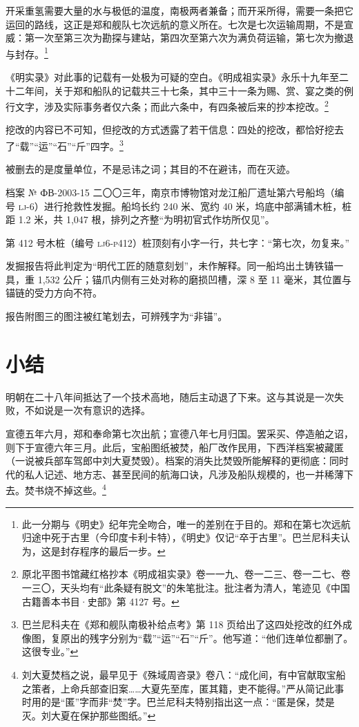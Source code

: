 开采重氢需要大量的水与极低的温度，南极两者兼备；而开采所得，需要一条把它运回的路线，这正是郑和舰队七次远航的意义所在。七次是七次运输周期，不是宣威：第一次至第三次为勘探与建站，第四次至第六次为满负荷运输，第七次为撤退与封存。\footnote{此一分期与《明史》纪年完全吻合，唯一的差别在于目的。郑和在第七次远航归途中死于古里（今印度卡利卡特），《明史》仅记“卒于古里”。巴兰尼科夫认为，这是封存程序的最后一步。}

《明实录》对此事的记载有一处极为可疑的空白。《明成祖实录》永乐十九年至二十二年间，关于郑和船队的记载共三十七条，其中三十一条为赐、赏、宴之类的例行文字，涉及实际事务者仅六条；而此六条中，有四条被后来的抄本挖改。\footnote{原北平图书馆藏红格抄本《明成祖实录》卷一一九、卷一二三、卷一二七、卷一三〇，天头均有“此条疑有脱文”的朱笔批注。批注者为清人，笔迹见《中国古籍善本书目·史部》第 4127 号。}

挖改的内容已不可知，但挖改的方式透露了若干信息：四处的挖改，都恰好挖去了“载”“运”“石”“斤”四字。\footnote{巴兰尼科夫在《郑和舰队南极补给点考》第 118 页给出了这四处挖改的红外成像图，复原出的残字分别为“载”“运”“石”“斤”。他写道：“他们连单位都删了。这很专业。”}

被删去的是度量单位，不是忌讳之词；其目的不在避讳，而在灭迹。

\begin{archive}{档案 № ФВ-2003-15}
二〇〇三年，南京市博物馆对龙江船厂遗址第六号船坞（编号 \textsc{lj}-6）进行抢救性发掘。船坞长约 240 米、宽约 40 米，坞底中部满铺木桩，桩距 1.2 米，共 1{,}047 根，排列之齐整“为明初官式作坊所仅见”。

第 412 号木桩（编号 \textsc{lj6-p412}）桩顶刻有小字一行，共七字：“第七次，勿复来。”

发掘报告将此判定为“明代工匠的随意刻划”，未作解释。同一船坞出土铸铁锚一具，重 1{,}532 公斤；锚爪内侧有三处对称的磨损凹槽，深 8 至 11 毫米，其位置与锚链的受力方向不符。

报告附图三的图注被红笔划去，可辨残字为“非锚”。
\end{archive}

\section{小结}

明朝在二十八年间抵达了一个技术高地，随后主动退了下来。这与其说是一次失败，不如说是一次有意识的选择。

宣德五年六月，郑和奉命第七次出航；宣德八年七月归国。罢采买、停造舶之诏，则下于宣德六年三月。此后，宝船图纸被焚，船厂改作民用，下西洋档案被藏匿（一说被兵部车驾郎中刘大夏焚毁）。档案的消失比焚毁所能解释的更彻底：同时代的私人记述、地方志、甚至民间的航海口诀，凡涉及船队规模的，也一并稀薄下去。焚书烧不掉这些。\footnote{刘大夏焚档之说，最早见于《殊域周咨录》卷八：“成化间，有中官献取宝船之策者，上命兵部查旧案……大夏先至库，匿其籍，吏不能得。”严从简记此事时用的是“匿”字而非“焚”字。巴兰尼科夫特别指出这一点：“匿是保，焚是灭。刘大夏在保护那些图纸。”}

